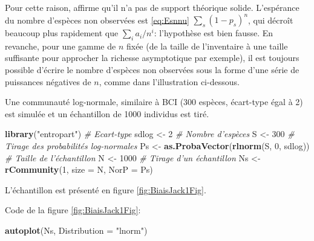 \documentclass[
  11pt,
  french,
  a4paper,
  extrafontsizes,onecolumn,openright
  ]{memoir}
\newenvironment{Shaded}{\begin{snugshade}}{\end{snugshade}}
\newcommand{\CommentTok}[1]{\textcolor[rgb]{0.56,0.35,0.01}{\textit{#1}}}
\newcommand{\DataTypeTok}[1]{\textcolor[rgb]{0.13,0.29,0.53}{#1}}
\newcommand{\DecValTok}[1]{\textcolor[rgb]{0.00,0.00,0.81}{#1}}
\newcommand{\KeywordTok}[1]{\textcolor[rgb]{0.13,0.29,0.53}{\textbf{#1}}}
\newcommand{\NormalTok}[1]{#1}
\newcommand{\StringTok}[1]{\textcolor[rgb]{0.31,0.60,0.02}{#1}}
\begin{document}
Pour cette raison, \textcite{Cormack1989} affirme qu'il n'a pas de support théorique solide.
L'espérance du nombre d'espèces non observées est \eqref{eq:Esnnu} \(\sum_s{(1-p_s)^n}\), qui décroît beaucoup plus rapidement que \(\sum_{i}{{a_i}/{n^i}}\): l'hypothèse est bien fausse.
En revanche, pour une gamme de \(n\) fixée (de la taille de l'inventaire à une taille suffisante pour approcher la richesse asymptotique par exemple), il est toujours possible d'écrire le nombre d'espèces non observées sous la forme d'une série de puissances négatives de \(n\), comme dans l'illustration ci-dessous.

Une communauté log-normale, similaire à BCI (300 espèces, écart-type égal à 2) est simulée et un échantillon de 1000 individus est tiré.

\scriptsize

\begin{Shaded}
\begin{Highlighting}[]
\KeywordTok{library}\NormalTok{(}\StringTok{"entropart"}\NormalTok{)}
\CommentTok{# Ecart-type}
\NormalTok{sdlog <-}\StringTok{ }\DecValTok{2}
\CommentTok{# Nombre d'espèces}
\NormalTok{S <-}\StringTok{ }\DecValTok{300}
\CommentTok{# Tirage des probabilités log-normales}
\NormalTok{Ps <-}\StringTok{ }\KeywordTok{as.ProbaVector}\NormalTok{(}\KeywordTok{rlnorm}\NormalTok{(S, }\DecValTok{0}\NormalTok{, sdlog))}
\CommentTok{# Taille de l'échantillon}
\NormalTok{N <-}\StringTok{ }\DecValTok{1000}
\CommentTok{# Tirage d'un échantillon}
\NormalTok{Ns <-}\StringTok{ }\KeywordTok{rCommunity}\NormalTok{(}\DecValTok{1}\NormalTok{, }\DataTypeTok{size =}\NormalTok{ N, }\DataTypeTok{NorP =}\NormalTok{ Ps)}
\end{Highlighting}
\end{Shaded}

\normalsize

L'échantillon est présenté en figure \ref{fig:BiaisJack1Fig}.

Code de la figure \ref{fig:BiaisJack1Fig}:

\scriptsize

\begin{Shaded}
\begin{Highlighting}[]
\KeywordTok{autoplot}\NormalTok{(Ns, }\DataTypeTok{Distribution =} \StringTok{"lnorm"}\NormalTok{)}
\end{Highlighting}
\end{Shaded}

\normalsize

\scriptsize
\end{document}
